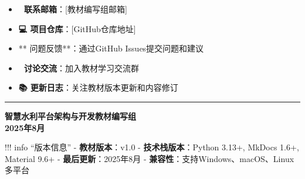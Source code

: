 \begin{itemize}
\tightlist
\item
  \textbf{📧 联系邮箱}：{[}教材编写组邮箱{]}
\item
  \textbf{💻 项目仓库}：{[}GitHub仓库地址{]}
\item
  ** 问题反馈**：通过GitHub Issues提交问题和建议
\item
  \textbf{💬 讨论交流}：加入教材学习交流群
\item
  \textbf{📚 更新日志}：关注教材版本更新和内容修订
\end{itemize}

\begin{center}\rule{0.5\linewidth}{0.5pt}\end{center}

\textbf{智慧水利平台架构与开发教材编写组}\\
\textbf{2025年8月}

!!! info ``版本信息'' - \textbf{教材版本}：v1.0 - \textbf{技术栈版本}：Python 3.13+, MkDocs 1.6+, Material 9.6+ - \textbf{最后更新}：2025年8月 - \textbf{兼容性}：支持Windows、macOS、Linux多平台
